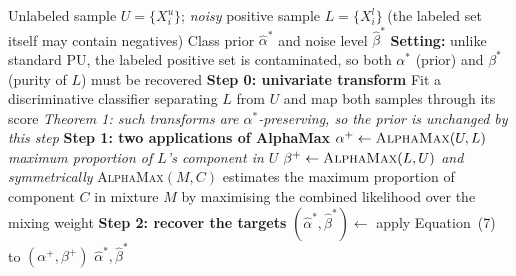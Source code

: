 \documentclass{article}
\begin{document}
\begin{algorithm}[!h]
\renewcommand{\algorithmicrequire}{\textbf{Input:}}
\renewcommand{\algorithmicensure}{\textbf{Output:}}
	\caption{AlphaMax-N (class prior from noisy positives and unlabeled data)}
	\begin{algorithmic}[1]
	    \REQUIRE
	    Unlabeled sample $U=\{X_{i}^{u}\}$; \emph{noisy} positive sample $L=\{X_{i}^{l}\}$
	    (the labeled set itself may contain negatives)
	    \ENSURE
	    Class prior $\hat{\alpha}^{\ast}$ and noise level $\hat{\beta}^{\ast}$
	    \STATE \textbf{Setting:} unlike standard PU, the labeled positive set is contaminated,
	    so both $\alpha^{\ast}$ (prior) and $\beta^{\ast}$ (purity of $L$) must be recovered %
	    \STATE \textbf{Step 0: univariate transform}
	    \STATE Fit a discriminative classifier separating $L$ from $U$ and map both samples through
	    its score %
	    \STATE \quad \emph{Theorem 1: such transforms are $\alpha^{\ast}$-preserving, so the prior
	    is unchanged by this step} %
	    \STATE \textbf{Step 1: two applications of AlphaMax}
	    \STATE $\alpha^{+}\leftarrow \textsc{AlphaMax}(U,L)$
	    \hfill \emph{maximum proportion of $L$'s component in $U$}
	    \STATE $\beta^{+}\leftarrow \textsc{AlphaMax}(L,U)$
	    \hfill \emph{and symmetrically} %
	    \STATE \quad \textsc{AlphaMax}$(M,C)$ estimates the maximum proportion of component $C$
	    in mixture $M$ by maximising the combined likelihood over the mixing weight
	    \STATE \textbf{Step 2: recover the targets}
	    \STATE $(\hat{\alpha}^{\ast},\hat{\beta}^{\ast})\leftarrow$ apply Equation~(7) to
	    $(\alpha^{+},\beta^{+})$ %
		\RETURN $\hat{\alpha}^{\ast},\hat{\beta}^{\ast}$
	\end{algorithmic}
\end{algorithm}
\end{document}
